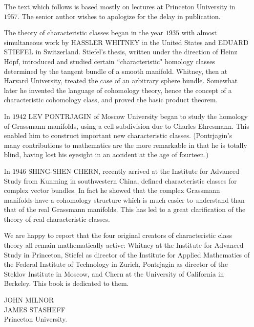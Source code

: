 
%

\cleardoublepage

\renewcommand{\prefacename}{Preface to the First Edition}
\begin{thepreface}
	The text which follows is based mostly on lectures at Princeton
	University in $1957$. The senior author wishes to apologize for the delay
	in publication.
	
	The theory of characteristic classes began in the year $1935$ with almost
	simultaneous work by HASSLER WHITNEY in the United States and
	EDUARD STIEFEL in Switzerland. Stiefel's thesis, written under the
	direction of Heinz Hopf, introduced and studied certain ``characteristic"
	homology classes determined by the tangent bundle of a smooth manifold.
	Whitney, then at Harvard University, treated the case of an arbitrary sphere
	bundle. Somewhat later he invented the language of cohomology theory,
	hence the concept of a characteristic cohomology class, and proved the
	basic product theorem.
	
	In $1942$ LEV PONTRJAGIN of Moscow University began to study the
	homology of Grassmann manifolds, using a cell subdivision due to Charles
	Ehresmann. This enabled him to construct important new characteristic
	classes. (Pontrjagin's many contributions to mathematics are the more
	remarkable in that he is totally blind, having lost his eyesight in an 
	accident at the age of fourteen.)
	
	In $1946$ SHING-SHEN CHERN, recently arrived at the Institute for
	Advanced Study from Kunming in southwestern China, defined 
	characteristic classes for complex vector bundles. In fact he showed that the 
	complex Grassmann manifolds have a cohomology structure which is much
	easier to understand than that of the real Grassmann manifolds. This has
	led to a great clarification of the theory of real characteristic classes.
	
	We are happy to report that the four original creators of characteristic
	class theory all remain mathematically active: Whitney at the Institute
	for Advanced Study in Princeton, Stiefel as director of the Institute for
	Applied Mathematics of the Federal Institute of Technology in Zurich,
	Pontrjagin as director of the Steklov Institute in Moscow, and Chern at
	the University of California in Berkeley. This book is dedicated to them.
	
	

\begin{flushright}
	JOHN MILNOR\\
	JAMES STASHEFF\\
	Princeton University.
\end{flushright}
\end{thepreface}

%
%

